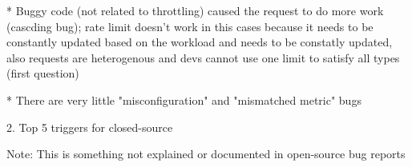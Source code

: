 * Buggy code (not related to throttling) caused the request to do more work (cascding bug); rate limit doesn't work in this cases because it needs to be constantly updated based on the workload and needs to be constatly updated, also requests are heterogenous and devs cannot use one limit to satisfy all types (first question)

* There are very little "misconfiguration" and "mismatched metric" bugs

2. Top 5 triggers for closed-source

Note: This is something not explained or documented in open-source bug reports 
